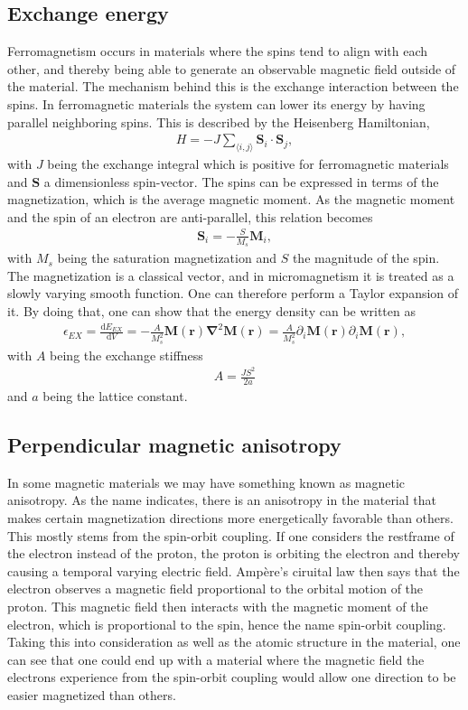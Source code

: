 \documentclass[12pt, a4paper, twoside, openright]{report}
\numberwithin{equation}{chapter}
\numberwithin{figure}{chapter}
\numberwithin{table}{chapter}
\begin{document}
\subsection{Exchange energy}
Ferromagnetism occurs in materials where the spins tend to align with each other, and thereby being able to generate an observable magnetic field outside of the material. The mechanism behind this is the exchange interaction between the spins. In ferromagnetic materials the system can lower its energy by having parallel neighboring spins. This is described by the Heisenberg Hamiltonian,
\begin{align}
H = - J\sum_{\langle i,j\rangle} \mathbold{S}_i\cdot\mathbold{S}_j,
\end{align}
with $J$ being the exchange integral which is positive for ferromagnetic materials and $\mathbold{S}$ a dimensionless spin-vector. The spins can be expressed in terms of the magnetization, which is the average magnetic moment. As the magnetic moment and the spin of an electron are anti-parallel, this relation becomes
\begin{align}
\mathbold{S}_i = -\frac{S}{M_s}\mathbold{M}_i,
\end{align}
with $M_s$ being the saturation magnetization and $S$ the magnitude of the spin. The magnetization is a classical vector, and in micromagnetism it is treated as a slowly varying smooth function. One can therefore perform a Taylor expansion of it. By doing that, one can show \cite{Project} that the energy density can be written as
\begin{align}
\epsilon_{EX} = \frac{\textrm{d} E_{EX}}{\textrm{d} V} = -\frac{A}{M_s^2}\mathbold{M}(\mathbold{r})\mathbold{\nabla}^2\mathbold{M}(\mathbold{r}) = \frac{A}{M_s^2}\partial_i\mathbold{M}(\mathbold{r})\partial_i\mathbold{M}(\mathbold{r}), \label{eq:exchDensity}
\end{align}
with $A$ being the exchange stiffness
\begin{align}
A = \frac{J S^2}{2a}
\end{align}
and $a$ being the lattice constant.
\subsection{Perpendicular magnetic anisotropy}
In some magnetic materials we may have something known as magnetic anisotropy. As the name indicates, there is an anisotropy in the material that makes certain magnetization directions more energetically favorable than others. This mostly stems from the spin-orbit coupling. If one considers the restframe of the electron instead of the proton, the proton is orbiting the electron and thereby causing a temporal varying electric field. Amp\`{e}re's ciruital law then says that the electron observes a magnetic field proportional to the orbital motion of the proton. This magnetic field then interacts with the magnetic moment of the electron, which is proportional to the spin, hence the name spin-orbit coupling. Taking this into consideration as well as the atomic structure in the material, one can see that one could end up with a material where the magnetic field the electrons experience from the spin-orbit coupling would allow one direction to be easier magnetized than others.
\end{document}
